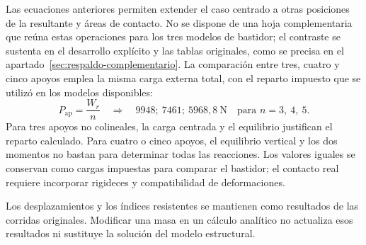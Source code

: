Las ecuaciones anteriores permiten extender el caso centrado a otras posiciones de la resultante y áreas de contacto. No se dispone de una hoja complementaria que reúna estas operaciones para los tres modelos de bastidor; el contraste se sustenta en el desarrollo explícito y las tablas originales, como se precisa en el apartado~\ref{sec:respaldo-complementario}. La comparación entre tres, cuatro y cinco apoyos emplea la misma carga externa total, con el reparto impuesto que se utilizó en los modelos disponibles:
\begin{equation}
P_{\mathrm{ap}}=\frac{W_r}{n}
\quad\Rightarrow\quad
9948;\ 7461;\ 5968{,}8\ \mathrm{N}
\quad\text{para } n=3,\ 4,\ 5.
\label{eq:manual_reparto_comparativo}
\end{equation}
Para tres apoyos no colineales, la carga centrada y el equilibrio justifican el reparto calculado. Para cuatro o cinco apoyos, el equilibrio vertical y los dos momentos no bastan para determinar todas las reacciones. Los valores iguales se conservan como cargas impuestas para comparar el bastidor; el contacto real requiere incorporar rigideces y compatibilidad de deformaciones.

Los desplazamientos y los índices resistentes se mantienen como resultados de las corridas originales. Modificar una masa en un cálculo analítico no actualiza esos resultados ni sustituye la solución del modelo estructural.
